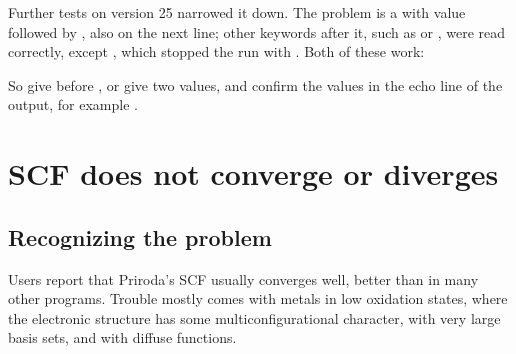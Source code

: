 \documentclass[letterpaper,10pt,english,openany,oneside]{sphinxmanual}
\begin{document}
\sphinxAtStartPar
Further tests on version 25 narrowed it down. The problem is a  with  value followed by
, also on the next line; other keywords after it, such as  or , were read
correctly, except , which stopped the run with . Both of these work:

\begin{sphinxVerbatim}[commandchars=\\\{\}]
\end{sphinxVerbatim}

\sphinxAtStartPar
So give  before , or give  two values, and confirm the values in the  echo line of the output, for
example .




\section{SCF does not converge or diverges}
\label{\detokenize{troubleshooting/common-problems:scf-does-not-converge-or-diverges}}\label{\detokenize{troubleshooting/common-problems:troubleshooting-scf}}

\subsection{Recognizing the problem}
\label{\detokenize{troubleshooting/common-problems:recognizing-the-problem}}
\sphinxAtStartPar
Users report that Priroda’s SCF usually converges well, better than in many other programs. Trouble mostly comes
with metals in low oxidation states, where the electronic structure has some multiconfigurational character, with
very large basis sets, and with diffuse functions.
\end{document}
